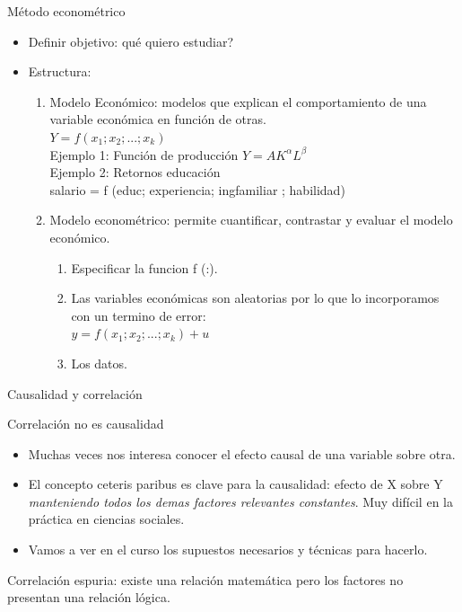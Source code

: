 \documentclass{beamer}
\begin{document}
\begin{frame}{M\'etodo econom\'etrico}
    
\begin{itemize}
    \item Definir objetivo: qu\'e quiero estudiar?
    \item  Estructura:
    {\small
\begin{enumerate}
    \item {\color{blue} Modelo Econ\'omico:} modelos que explican el comportamiento de una variable económica en
funci\'on de otras.\\

 $Y = f (x_1; x_2; ...; x_k)$\\
Ejemplo 1: Funci\'on de producci\'on $Y = AK^{\alpha}L^{\beta}$\\
Ejemplo 2: Retornos educaci\'on\\
salario = f (educ; experiencia; ingfamiliar ; habilidad)
\item {\color{blue}Modelo econom\'etrico:} permite cuantificar, contrastar y evaluar el modelo
econ\'omico.
\begin{enumerate}
    \item Especificar la funcion f (:).
    \item Las variables econ\'omicas son aleatorias por lo que lo incorporamos con un termino de
error:\\ 
$y = f (x_1; x_2;...; x_k) + u$
\item Los datos. 
\end{enumerate} 

\end{enumerate}}
\end{itemize}

\end{frame}

\begin{frame}{Causalidad y correlación}

{\color{blue}    Correlaci\'on no es causalidad}
\begin{itemize}
    \item  Muchas veces nos interesa conocer el efecto causal de una variable sobre otra.
    \item  El concepto {\color{blue} ceteris paribus } es clave para la causalidad: efecto de X sobre Y
{\it manteniendo todos los demas factores relevantes constantes}.
 Muy dif\'icil en la pr\'actica en ciencias sociales.
 \item  Vamos a ver en el curso los supuestos necesarios y t\'ecnicas para
hacerlo.
\end{itemize}
{\color{blue}Correlaci\'on espuria:} existe una relación matem\'atica pero los factores no
presentan una relaci\'on l\'ogica.
\end{frame}
\end{document}
